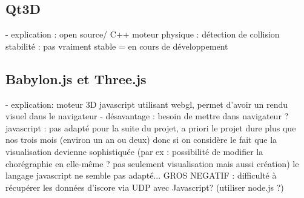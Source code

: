\subsection{Qt3D}
- explication : open source/ C++
moteur physique : détection de collision
stabilité : pas vraiment stable = en cours de développement

\subsection{Babylon.js et Three.js}
- explication: moteur 3D javascript utilisant webgl, permet d'avoir un rendu visuel dans le navigateur
- désavantage : 
		besoin de mettre dans navigateur  ? 
	javascript : pas adapté pour la suite du projet, a priori le projet dure plus que nos trois mois (environ un an ou deux) donc si on considère le fait que la visualisation devienne sophistiquée (par ex : possibilité de modifier la chorégraphie en elle-même ? pas seulement visualisation mais aussi création) le langage javascript ne semble pas adapté...
		GROS NEGATIF : difficulté à récupérer les données d'iscore via UDP avec Javascript? (utiliser node.js ?)